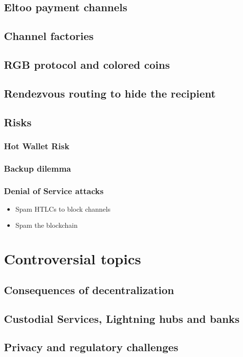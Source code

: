 \documentclass[ebook,12pt,oneside,openany]{memoir}
\begin{document}
\section{Eltoo payment channels}
\section{Channel factories}
\section{RGB protocol and colored coins}
\section{Rendezvous routing to hide the recipient}
\section{Risks}
\subsection{Hot Wallet Risk}
\subsection{Backup dilemma}
\subsection{Denial of Service attacks}
\begin{itemize}
\item Spam HTLCs to block channels
\item Spam the blockchain
\end{itemize}
\chapter{Controversial topics}
\section{Consequences of decentralization}
\section{Custodial Services, Lightning hubs and banks}
\section{Privacy and regulatory challenges}
\end{document}
